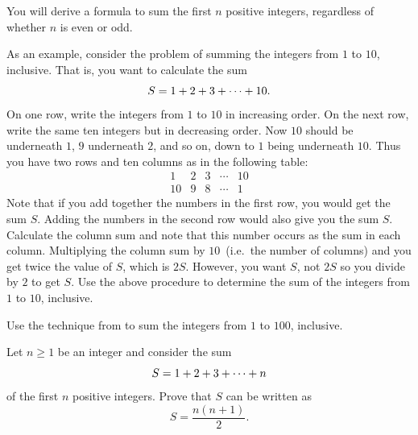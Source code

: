 \documentclass[a4paper,oneside,12pt]{article}
\begin{document}
\begin{problem}
\item You will derive a formula to sum the first $n$ positive
  integers, regardless of whether $n$ is even or odd.
  \begin{packedenum}
  \item\label{subprob:sum_first_10}
    As an example, consider the problem of summing the integers from
    $1$ to $10$, inclusive.  That is, you want to calculate the sum
    \[
    S
    =
    {1 + 2} + {3} + \cdots + {10}.
    \]
    On one row, write the integers from $1$ to $10$ in increasing
    order.  On the next row, write the same ten integers but in
    decreasing order.  Now $10$ should be underneath $1$, $9$
    underneath $2$, and so on, down to $1$ being underneath $10$.
    Thus you have two rows and ten columns as in the following table:
    \[
    \begin{matrix}
    1  & 2 & 3 & \cdots & 10 \\[4pt]
    10 & 9 & 8 & \cdots & 1
    \end{matrix}
    \]
    Note that if you add together the numbers in the first row, you
    would get the sum $S$.  Adding the numbers in the second row would
    also give you the sum $S$.  Calculate the column sum and note that
    this number occurs as the sum in each column.  Multiplying the
    column sum by $10$~(i.e.~the number of columns) and you get twice
    the value of $S$, which is $2S$.  However, you want $S$, not $2S$
    so you divide by $2$ to get $S$.  Use the above procedure to
    determine the sum of the integers from $1$ to $10$, inclusive.

  \item\label{subprob:sum_first_100}
    Use the technique from  to sum the
    integers from $1$ to $100$, inclusive.

  \item\label{subprob:sum_first_n_positive}
    Let $n \geq 1$ be an integer and consider the sum
    \[
    S
    =
    {1 + 2} + {3} + \cdots + {n}
    \]
    of the first $n$ positive integers.  Prove that $S$ can be written
    as
    \[
    S
    =
    \frac{n(n + 1)}{2}.
    \]
  \end{packedenum}
\end{problem}
\end{document}
